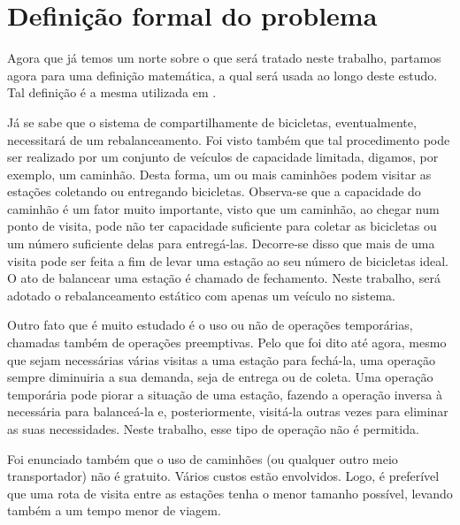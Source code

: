 \section{Definição formal do problema}\label{sec:LABEL_CHP_1_SEC_A}
Agora que já temos um norte sobre o que será tratado neste trabalho, partamos agora para uma definição matemática, a qual será usada ao longo deste estudo. Tal definição é a mesma utilizada em \citep{art:REF_ART_1}.

\par Já se sabe que o sistema de compartilhamente de bicicletas, eventualmente, necessitará de um rebalanceamento. Foi visto também que tal procedimento pode ser realizado por um conjunto de veículos de capacidade limitada, digamos, por exemplo, um caminhão. Desta forma, um ou mais caminhões podem visitar as estações coletando ou entregando bicicletas. Observa-se que a capacidade do caminhão é um fator muito importante, visto que um caminhão, ao chegar num ponto de visita, pode não ter capacidade suficiente para coletar as bicicletas ou um número suficiente delas para entregá-las. Decorre-se disso que mais de uma visita pode ser feita a fim de levar uma estação ao seu número de bicicletas ideal. O ato de balancear uma estação é chamado de fechamento. Neste trabalho, será adotado o rebalanceamento estático com apenas um veículo no sistema. \par Outro fato que é muito estudado é o uso ou não de operações temporárias, chamadas também de operações preemptivas. Pelo que foi dito até agora, mesmo que sejam necessárias várias visitas a uma estação para fechá-la, uma operação sempre diminuiria a sua demanda, seja de entrega ou de coleta. Uma operação temporária pode piorar a situação de uma estação, fazendo a operação inversa à necessária para balanceá-la e, posteriormente, visitá-la outras vezes para eliminar as suas necessidades. Neste trabalho, esse tipo de operação não é permitida. \par Foi enunciado também que o uso de caminhões (ou qualquer outro meio transportador) não é gratuito. Vários custos estão envolvidos. Logo, é preferível que uma rota de visita entre as estações tenha o menor tamanho possível, levando também a um tempo menor de viagem.
